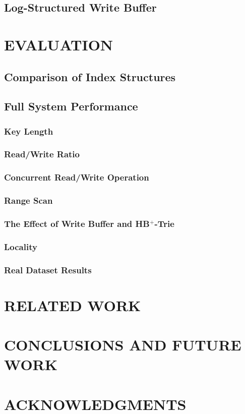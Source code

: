 \documentclass[lang=cn]{cls/elegantpaper}
\begin{document}
\subsection{Log-Structured Write Buffer}

\section{EVALUATION}

\subsection{Comparison of Index Structures}

\subsection{Full System Performance}

\subsubsection{Key Length}

\subsubsection{Read/Write Ratio}

\subsubsection{Concurrent Read/Write Operation}

\subsubsection{Range Scan}

\subsubsection{The Effect of Write Buffer and HB$^+$-Trie}

\subsubsection{Locality}

\subsubsection{Real Dataset Results}

\section{RELATED WORK}

\section{CONCLUSIONS AND FUTURE WORK}

\section{ACKNOWLEDGMENTS}


\end{document}
